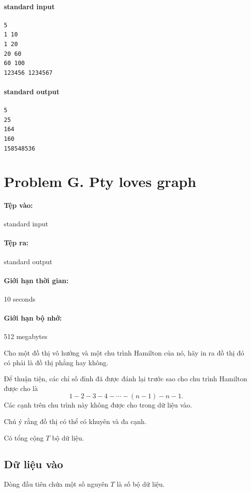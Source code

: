 \documentclass[11pt]{article}
\begin{document}
\paragraph{standard input}
\begin{verbatim}
5
1 10
1 20
20 60
60 100
123456 1234567
\end{verbatim}

\paragraph{standard output}
\begin{verbatim}
5
25
164
160
158548536
\end{verbatim}

\section{Problem G. Pty loves graph}

\paragraph{Tệp vào:} standard input
\paragraph{Tệp ra:} standard output
\paragraph{Giới hạn thời gian:} 10 seconds
\paragraph{Giới hạn bộ nhớ:} 512 megabytes

Cho một đồ thị vô hướng và một chu trình Hamilton của nó, hãy in ra đồ thị đó
có phải là đồ thị phẳng hay không.

Để thuận tiện, các chỉ số đỉnh đã được đánh lại trước sao cho chu trình
Hamilton được cho là
\[
  1-2-3-4-\cdots-(n-1)-n-1.
\]
Các cạnh trên chu trình này không được cho trong dữ liệu vào.

Chú ý rằng đồ thị có thể có khuyên và đa cạnh.

Có tổng cộng \(T\) bộ dữ liệu.

\subsection*{Dữ liệu vào}

Dòng đầu tiên chứa một số nguyên \(T\) là số bộ dữ liệu.
\end{document}
